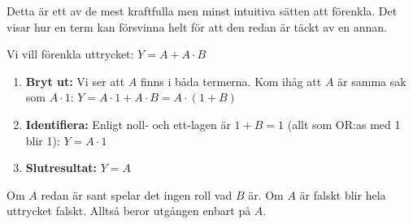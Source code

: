 \documentclass[
  swedish,
  letterpaper,
  oneside,
  openany]{book}
\begin{document}
\begin{tcolorbox}[enhanced jigsaw, arc=.35mm, bottomrule=.15mm, bottomtitle=1mm, breakable, colback=white, colbacktitle=quarto-callout-note-color!10!white, colframe=quarto-callout-note-color-frame, coltitle=black, left=2mm, leftrule=.75mm, opacityback=0, opacitybacktitle=0.6, rightrule=.15mm, title=\textcolor{quarto-callout-note-color}{\faInfo}\hspace{0.5em}{Exempel: Absorptionslagen (Att ``äta upp'' termer)}, titlerule=0mm, toprule=.15mm, toptitle=1mm]

Detta är ett av de mest kraftfulla men minst intuitiva sätten att
förenkla. Det visar hur en term kan försvinna helt för att den redan är
täckt av en annan.

Vi vill förenkla uttrycket: \(Y = A + A \cdot B\)

\begin{enumerate}
\def\labelenumi{\arabic{enumi}.}
\item
  \textbf{Bryt ut:} Vi ser att \(A\) finns i båda termerna. Kom ihåg att
  \(A\) är samma sak som \(A \cdot 1\):
  \(Y = A \cdot 1 + A \cdot B = A \cdot (1 + B)\)
\item
  \textbf{Identifiera:} Enligt noll- och ett-lagen är \(1 + B = 1\)
  (allt som OR:as med 1 blir 1): \(Y = A \cdot 1\)
\item
  \textbf{Slutresultat:} \(Y = A\)
\end{enumerate}

Om \(A\) redan är sant spelar det ingen roll vad \(B\) är. Om \(A\) är
falskt blir hela uttrycket falskt. Alltså beror utgången enbart på
\(A\).

\end{tcolorbox}
\end{document}
